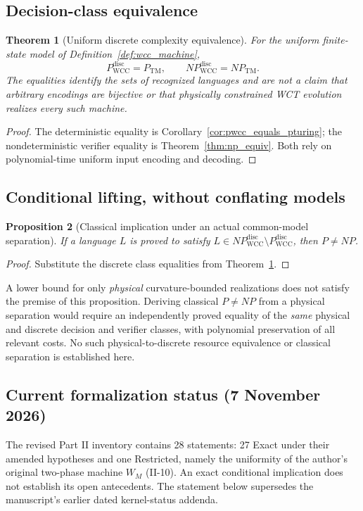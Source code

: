 \documentclass[12pt]{article}
\newcommand{\TM}{\mathrm{TM}}
\newtheorem{theorem}{Theorem}[section]
\newtheorem{proposition}[theorem]{Proposition}
\begin{document}
\subsection{Decision-class equivalence}
\begin{theorem}[Uniform discrete complexity equivalence]
\label{thm:uniform-discrete-bijection}
For the uniform finite-state model of Definition~\ref{def:wcc_machine},
\[
P_{\mathrm{WCC}}^{\mathrm{disc}}=P_{\TM},
\qquad
NP_{\mathrm{WCC}}^{\mathrm{disc}}=NP_{\TM}.
\]
The equalities identify the \emph{sets of recognized languages} and
are not a claim that arbitrary encodings are bijective or that
physically constrained WCT evolution realizes every such machine.
\end{theorem}
\begin{proof}
The deterministic equality is
Corollary~\ref{cor:pwcc_equals_pturing}; the nondeterministic
verifier equality is Theorem~\ref{thm:np_equiv}.
Both rely on polynomial-time uniform input encoding and decoding.
\end{proof}

\subsection{Conditional lifting, without conflating models}
\begin{proposition}[Classical implication under an actual common-model separation]
\label{prop:conditional-classical-lift}
If a language $L$ is proved to satisfy
$L\in NP_{\mathrm{WCC}}^{\mathrm{disc}}\setminus
P_{\mathrm{WCC}}^{\mathrm{disc}}$, then $P\ne NP$.
\end{proposition}
\begin{proof}
Substitute the discrete class equalities from
Theorem~\ref{thm:uniform-discrete-bijection}.
\end{proof}

A lower bound for only \emph{physical} curvature-bounded realizations
does not satisfy the premise of this proposition. Deriving classical
$P\ne NP$ from a physical separation would require an independently
proved equality of the \emph{same} physical and discrete decision and
verifier classes, with polynomial preservation of all relevant costs.
No such physical-to-discrete resource equivalence or classical
separation is established here.

\subsection{Current formalization status (7 November 2026)}
\label{sec:current-lean-status}
The revised Part II inventory contains 28 statements:
27 Exact under their amended hypotheses and
one Restricted, namely the uniformity of the author's
original two-phase machine $W_M$ (II-10).
An exact conditional implication does not establish
its open antecedents.  The statement below supersedes
the manuscript's earlier dated kernel-status addenda.
\end{document}
